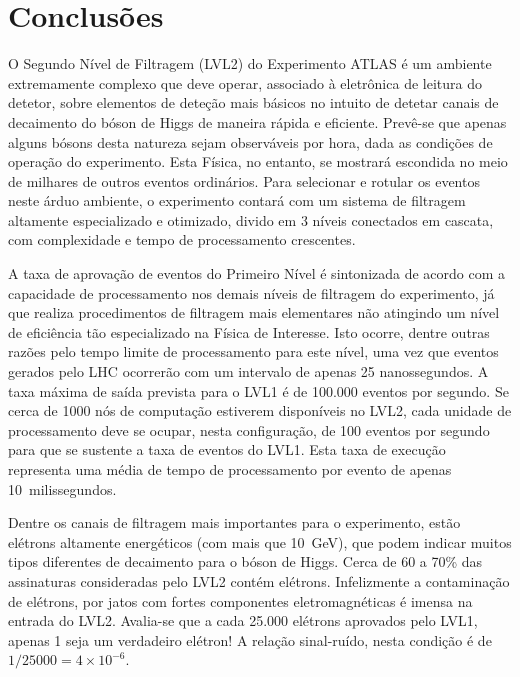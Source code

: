 \typeout{ ====================================================================}
\typeout{ ====================================================================}

\chapter{Conclusões}
\label{chap:conclusions}

O Segundo Nível de Filtragem (LVL2) do Experimento ATLAS é um ambiente
extremamente complexo que deve operar, associado à eletrônica de leitura do
detetor, sobre elementos de deteção mais básicos no intuito de detetar canais
de decaimento do bóson de Higgs de maneira rápida e eficiente. Prevê-se que
apenas alguns bósons desta natureza sejam observáveis por hora, dada as
condições de operação do experimento. Esta Física, no entanto, se mostrará
escondida no meio de milhares de outros eventos ordinários. Para selecionar e
rotular os eventos  neste árduo ambiente, o experimento contará
com um sistema de filtragem altamente especializado e otimizado, divido em 3
níveis conectados em cascata, com complexidade e tempo de processamento
crescentes. 

A taxa de aprovação de eventos do Primeiro Nível é sintonizada de acordo com a
capacidade de processamento nos demais níveis de filtragem do experimento, já
que realiza procedimentos de filtragem mais elementares não atingindo um nível
de eficiência tão especializado na Física de Interesse. Isto ocorre, dentre
outras razões pelo tempo limite de processamento para este nível, uma vez que
eventos gerados pelo LHC ocorrerão com um intervalo de apenas 25
nanossegundos. A taxa máxima de saída prevista para o LVL1 é de 100.000
eventos por segundo. Se cerca de 1000 nós de computação estiverem disponíveis
no LVL2, cada unidade de processamento deve se ocupar, nesta configuração, de
100 eventos por segundo para que se sustente a taxa de eventos do LVL1. Esta
taxa de execução representa uma média de tempo de processamento por evento de
apenas 10~milissegundos.

Dentre os canais de filtragem mais importantes para o experimento, estão
elétrons altamente energéticos (com mais que 10~GeV), que podem indicar muitos
tipos diferentes de decaimento para o bóson de Higgs. Cerca de 60 a 70\% das
assinaturas consideradas pelo LVL2 contém elétrons. Infelizmente a
contaminação de elétrons, por jatos com fortes componentes eletromagnéticas é
imensa na entrada do LVL2. Avalia-se que a cada 25.000 elétrons aprovados pelo
LVL1, apenas 1 seja um verdadeiro elétron! A relação sinal-ruído, nesta
condição é de $1/25000 = 4\times10^{-6}$.

